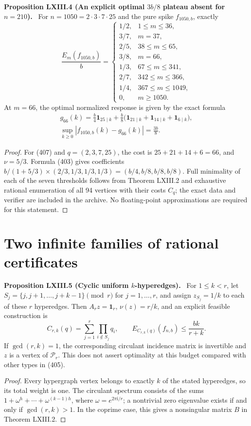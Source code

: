 \documentclass[11pt,a4paper,oneside]{book}
\newcommand{\one}{\mathbf 1}\newcommand{\ii}{\mathrm i}\newcommand{\dd}{\mathrm d}
\newcommand{\statement}[3]{\par\medskip\noindent\textbf{#1 #2 (#3).}\ }
\begin{document}
\statement{Proposition}{LXIII.4}{An explicit optimal $3b/8$ plateau absent for $n=210$}
For $n=1050=2\cdot3\cdot7\cdot25$ and the pure spike $f_{1050,b}$, exactly
\begin{equation}
\frac{E_m(f_{1050,b})}{b}=\begin{cases}
1/2,&1\le m\le36,\\
3/7,&m=37,\\
2/5,&38\le m\le65,\\
3/8,&m=66,\\
1/3,&67\le m\le341,\\
2/7,&342\le m\le366,\\
1/4,&367\le m\le1049,\\
0,&m\ge1050.
\end{cases}\tag{409}
\end{equation}
At $m=66$, the optimal normalized response is given by the exact formula
\begin{equation}
\begin{gathered}
g_{66}(k)=\frac b4\one_{25\mid k}+\frac b8\bigl(\one_{21\mid k}+\one_{14\mid k}+\one_{6\mid k}\bigr),\\
\sup_{k\ge0}|f_{1050,b}(k)-g_{66}(k)|=\frac{3b}{8}.
\end{gathered}\tag{410}
\end{equation}
\begin{proof}
For (407) and $q=(2,3,7,25)$, the cost is $25+21+14+6=66$, and $\nu=5/3$. Formula (403) gives coefficients $b/(1+5/3)\times(2/3,1/3,1/3,1/3)=(b/4,b/8,b/8,b/8)$. Full minimality of each of the seven thresholds follows from Theorem LXIII.2 and exhaustive rational enumeration of all 94 vertices with their costs $C_q$; the exact data and verifier are included in the archive. No floating-point approximations are required for this statement.
\end{proof}

\section{Two infinite families of rational certificates}
\statement{Proposition}{LXIII.5}{Cyclic uniform $k$-hyperedges}
For $1\le k<r$, let $S_j=\{j,j+1,\ldots,j+k-1\}\pmod r$ for $j=1,\ldots,r$, and assign $z_{S_j}=1/k$ to each of these $r$ hyperedges. Then $A_rz=\one_r$, $\nu(z)=r/k$, and an explicit feasible construction is
\begin{equation}
C_{r,k}(q)=\sum_{j=1}^r\prod_{i\notin S_j}q_i,\qquad
E_{C_{r,k}(q)}(f_{n,b})\le\frac{bk}{r+k}.\tag{411}
\end{equation}
If $\gcd(r,k)=1$, the corresponding circulant incidence matrix is invertible and $z$ is a vertex of $\mathcal P_r$. This does not assert optimality at this budget compared with other types in (405).
\begin{proof}
Every hypergraph vertex belongs to exactly $k$ of the stated hyperedges, so its total weight is one. The circulant spectrum consists of the sums $1+\omega^h+\cdots+\omega^{(k-1)h}$, where $\omega=e^{2\pi\ii/r}$; a nontrivial zero eigenvalue exists if and only if $\gcd(r,k)>1$. In the coprime case, this gives a nonsingular matrix $B$ in Theorem LXIII.2.
\end{proof}
\end{document}
